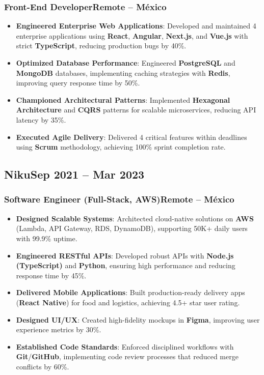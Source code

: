 \documentclass[a4paper,10pt]{article}
\newcommand{\kw}[1]{\textbf{\textcolor{keyword}{#1}}}
\newcommand{\tech}[1]{\textbf{\textcolor{tech}{#1}}}
\begin{document}
\subsubsection*{Front-End Developer\hfill Remote -- México}
\begin{itemize}[noitemsep, leftmargin=*]
    \item \textbf{Engineered Enterprise Web Applications}: Developed and maintained 4 enterprise applications using \tech{React}, \tech{Angular}, \tech{Next.js}, and \tech{Vue.js} with strict \tech{TypeScript}, reducing production bugs by 40\%.
    \item \textbf{Optimized Database Performance}: Engineered \kw{PostgreSQL} and \kw{MongoDB} databases, implementing caching strategies with \tech{Redis}, improving query response time by 50\%.
    \item \textbf{Championed Architectural Patterns}: Implemented \kw{Hexagonal Architecture} and \kw{CQRS} patterns for scalable microservices, reducing API latency by 35\%.
    \item \textbf{Executed Agile Delivery}: Delivered 4 critical features within deadlines using \kw{Scrum} methodology, achieving 100\% sprint completion rate.
\end{itemize}

\subsection*{Niku\hfill\textbf{Sep 2021 -- Mar 2023}}
\subsubsection*{Software Engineer (Full-Stack, AWS)\hfill Remote -- México}
\begin{itemize}[noitemsep, leftmargin=*]
    \item \textbf{Designed Scalable Systems}: Architected cloud-native solutions on \tech{AWS} (Lambda, API Gateway, RDS, DynamoDB), supporting 50K+ daily users with 99.9\% uptime.
    \item \textbf{Engineered RESTful APIs}: Developed robust APIs with \tech{Node.js (TypeScript)} and \tech{Python}, ensuring high performance and reducing response time by 45\%.
    \item \textbf{Delivered Mobile Applications}: Built production-ready delivery apps (\tech{React Native}) for food and logistics, achieving 4.5+ star user rating.
    \item \textbf{Designed UI/UX}: Created high-fidelity mockups in \tech{Figma}, improving user experience metrics by 30\%.
    \item \textbf{Established Code Standards}: Enforced disciplined workflows with \tech{Git}/\tech{GitHub}, implementing code review processes that reduced merge conflicts by 60\%.
\end{itemize}
\end{document}

